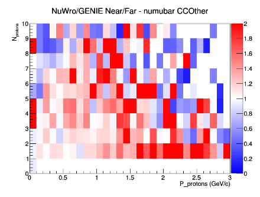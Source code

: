\documentclass[12pt]{article}
\begin{document}
\begin{figure}[h]
\endminipage
{}
\includegraphics[width=\linewidth]{N_P/nominal/protons/ratios/CCOther_NuWro_GENIE_numubar_NF_N_P.png}
\endminipage
\newline
\end{figure}
\clearpage
\end{document}
